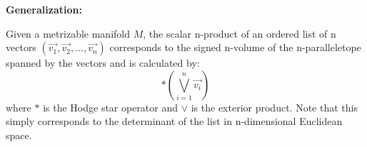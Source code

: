 \documentclass[12pt]{article}
\begin{document}
\textbf{Generalization:}

Given a metrizable manifold $M$, the scalar n-product of an ordered list of n vectors $(\vec{v_1}, \vec{v_2}, \dotsc, \vec{v_n})$ corresponds to the signed n-volume of the n-paralleletope spanned by the vectors and is calculated by:
$$\ast(\bigvee\limits_{i=1}^n\vec{v_i})$$
where $\ast$ is the Hodge star operator and $\vee$ is the exterior product. Note that this simply corresponds to the determinant of the list in n-dimensional Euclidean space.
\end{document}
